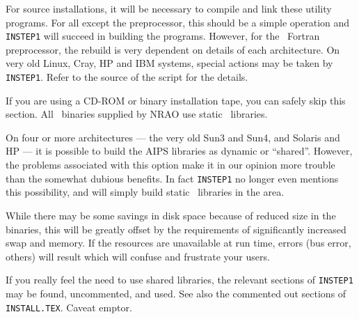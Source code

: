 For source installations, it will be necessary to compile and link these
utility programs.  For all except the preprocessor, this should be a
simple operation and {\tt INSTEP1} will succeed in building the
programs.  However, for the \AIPS\ Fortran preprocessor, the rebuild is
very dependent on details of each architecture.  On very old Linux,
Cray, HP and IBM systems, special actions may be taken by {\tt INSTEP1}.
Refer to the source of the script for the details.

\medskip{}

If you are using a CD-ROM or binary installation tape, you can safely
skip this section.  All  \AIPS\ binaries supplied by NRAO use static
\AIPS\ libraries.

On four or more architectures --- the very old Sun3 and Sun4, and
Solaris and HP --- it is possible to build the AIPS libraries as dynamic
or ``shared''.  However, the problems associated with this option make
it in our opinion more trouble than the somewhat dubious benefits.  In
fact {\tt INSTEP1} no longer even mentions this possibility, and will
simply build static \AIPS\ libraries in the {\tt\LIBR} area.

While there may be some savings in disk space because of reduced size in
the binaries, this will be greatly offset by the requirements of
significantly increased swap and memory.  If the resources are
unavailable at run time, errors (bus error, others) will result which
will confuse and frustrate your users.

If you really feel the need to use shared libraries, the relevant
sections of {\tt INSTEP1} may be found, uncommented, and used.  See also
the commented out sections of {\tt INSTALL.TEX}.  Caveat emptor.


